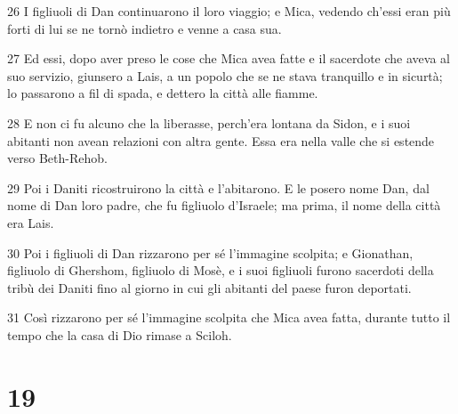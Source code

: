 \par 26 I figliuoli di Dan continuarono il loro viaggio; e Mica, vedendo ch'essi eran più forti di lui se ne tornò indietro e venne a casa sua.
\par 27 Ed essi, dopo aver preso le cose che Mica avea fatte e il sacerdote che aveva al suo servizio, giunsero a Lais, a un popolo che se ne stava tranquillo e in sicurtà; lo passarono a fil di spada, e dettero la città alle fiamme.
\par 28 E non ci fu alcuno che la liberasse, perch'era lontana da Sidon, e i suoi abitanti non avean relazioni con altra gente. Essa era nella valle che si estende verso Beth-Rehob.
\par 29 Poi i Daniti ricostruirono la città e l'abitarono. E le posero nome Dan, dal nome di Dan loro padre, che fu figliuolo d'Israele; ma prima, il nome della città era Lais.
\par 30 Poi i figliuoli di Dan rizzarono per sé l'immagine scolpita; e Gionathan, figliuolo di Ghershom, figliuolo di Mosè, e i suoi figliuoli furono sacerdoti della tribù dei Daniti fino al giorno in cui gli abitanti del paese furon deportati.
\par 31 Così rizzarono per sé l'immagine scolpita che Mica avea fatta, durante tutto il tempo che la casa di Dio rimase a Sciloh.

\chapter{19}

